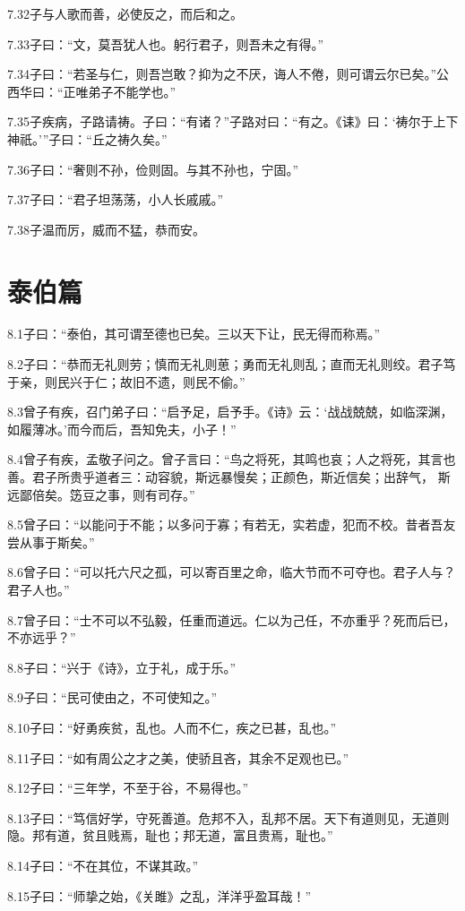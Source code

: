 \documentclass[a4paper,12pt,UTF8,twoside]{ctexbook}
\begin{document}
7.32子与人歌而善，必使反之，而后和之。

7.33子曰：“文，莫吾犹人也。躬行君子，则吾未之有得。”

7.34子曰：“若圣与仁，则吾岂敢？抑为之不厌，诲人不倦，则可谓云尔已矣。”公西华曰：“正唯弟子不能学也。”

7.35子疾病，子路请祷。子曰：“有诸？”子路对曰：“有之。《诔》曰：‘祷尔于上下神祇。’”子曰：“丘之祷久矣。”

7.36子曰：“奢则不孙，俭则固。与其不孙也，宁固。”

7.37子曰：“君子坦荡荡，小人长戚戚。”

7.38子温而厉，威而不猛，恭而安。

\chapter{泰伯篇}
8.1子曰：“泰伯，其可谓至德也已矣。三以天下让，民无得而称焉。”

8.2子曰：“恭而无礼则劳；慎而无礼则葸；勇而无礼则乱；直而无礼则绞。君子笃于亲，则民兴于仁；故旧不遗，则民不偷。”

8.3曾子有疾，召门弟子曰：“启予足，启予手。《诗》云：‘战战兢兢，如临深渊，如履薄冰。’而今而后，吾知免夫，小子！”

8.4曾子有疾，孟敬子问之。曾子言曰：“鸟之将死，其鸣也哀；人之将死，其言也善。君子所贵乎道者三：动容貌，斯远暴慢矣；正颜色，斯近信矣；出辞气，
斯远鄙倍矣。笾豆之事，则有司存。”

8.5曾子曰：“以能问于不能；以多问于寡；有若无，实若虚，犯而不校。昔者吾友尝从事于斯矣。”

8.6曾子曰：“可以托六尺之孤，可以寄百里之命，临大节而不可夺也。君子人与？君子人也。”

8.7曾子曰：“士不可以不弘毅，任重而道远。仁以为己任，不亦重乎？死而后已，不亦远乎？”

8.8子曰：“兴于《诗》，立于礼，成于乐。”

8.9子曰：“民可使由之，不可使知之。”

8.10子曰：“好勇疾贫，乱也。人而不仁，疾之已甚，乱也。”

8.11子曰：“如有周公之才之美，使骄且吝，其余不足观也已。”

8.12子曰：“三年学，不至于谷，不易得也。”

8.13子曰：“笃信好学，守死善道。危邦不入，乱邦不居。天下有道则见，无道则隐。邦有道，贫且贱焉，耻也；邦无道，富且贵焉，耻也。”

8.14子曰：“不在其位，不谋其政。”

8.15子曰：“师挚之始，《关雎》之乱，洋洋乎盈耳哉！”
\end{document}
